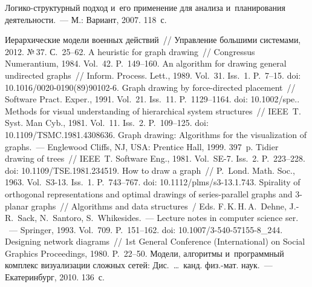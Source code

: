 \begin{multicols}{2}
{{\begin{thebibliography}{99}
 Ло\-ги\-ко-струк\-тур\-ный подход и~его применение для 
анализа и~планирования деятельности.~--- М.: Вариант, 2007. 118~с.

 Иерархические модели военных действий~// Управление большими 
системами, 2012. №\,37. С.~25--62.
 A heuristic for graph drawing~// Congressus Numerantium, 1984. Vol.~42. P.~149--160.
 An algorithm for drawing general undirected graphs~// Inform. 
Process. Lett., 1989. Vol.~31. Iss.~1. 
 P.~7--15.  doi: 10.1016/0020-0190(89)90102-6.
 Graph drawing by force-directed placement~// Software 
Pract. Exper., 1991. Vol.~21. Iss.~11. P.~1129--1164. doi: 10.1002/spe..
 Methods for visual understanding of hierarchical system 
structures~// IEEE~T. Syst. Man Cyb., 1981. Vol.~11. Iss.~2. P.~109--125. doi: 
10.1109/TSMC.1981.4308636.
 Graph drawing: Algorithms for the 
visualization of graphs.~--- Englewood Cliffs, NJ, USA: Prentice Hall, 1999. 397~p. 
 Tidier drawing of trees~// IEEE~T. Software Eng., 1981. 
Vol.~SE-7. Iss.~2. P.~223--228. doi: 10.1109/TSE.1981.234519.
 How to draw a graph~// P.~Lond. Math. Soc., 1963. Vol.~S3-13. Iss.~1. 
P.~743--767. doi: 10.1112/plms/s3-13.1.743.
 Spirality of orthogonal representations and optimal 
drawings of series-parallel graphs and 3-planar graphs~// Algorithms and data 
structures~/ Eds. F.\,K.\,H.\,A.~Dehne, J.-R.~Sack, N.~Santoro, S.~Whikesides.~---  
Lecture notes in computer science ser. ~--- Springer, 1993. Vol.~709.  
P.~151--162. doi: 10.1007/3-540-57155-8\_244.
 Designing network diagrams~// 1st General Conference 
(International) on Social Graphics Proceedings, 1980. P.~22--50. 
 Модели, алгоритмы и~программный комплекс визуализации сложных 
сетей:  
Дис.\ \ldots\ канд. физ.-мат. наук.~--- Екатеринбург, 2010. 136~с.
   \end{thebibliography}
   
    }
    }
   
   \end{multicols}
   
